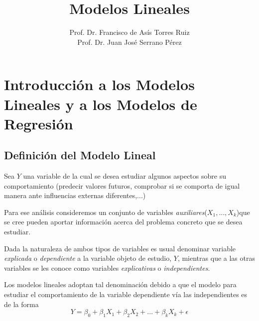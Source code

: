 \documentclass[10pt,a4paper]{book}
\title{{\Huge Modelos Lineales}}
\author{Prof. Dr. Francisco de Asís Torres Ruiz\\
		Prof. Dr. Juan José Serrano Pérez}
\date{}
\begin{document}
\maketitle
\tableofcontents

\chapter{Introducción a los Modelos Lineales y a los Modelos de Regresión}
	\section{Definición del Modelo Lineal}
Sea $Y$ una variable de la cual se desea estudiar algunos aspectos sobre su comportamiento (predecir valores futuros, comprobar si se comporta de igual manera ante influencias externas diferentes,...)

Para ese análisis consideremos un conjunto de variables \textit{auxiliares}($X_1,...,X_k$)que se cree pueden aportar información acerca del problema concreto que se desea estudiar.

Dada la naturaleza de ambos tipos de variables es usual denominar variable \emph{explicada} o \emph{dependiente} a la variable objeto de estudio, $Y$, mientras que a las otras variables se les conoce como variables \emph{explicativas} o \emph{independientes}.

Los modelos lineales adoptan tal denominación debido a que el modelo para estudiar el comportamiento de la variable dependiente vía las independientes es de la forma $$Y = \beta_0 + \beta_1X_1 + \beta_2X_2 +...+ \beta_kX_k + \epsilon$$
\end{document}
